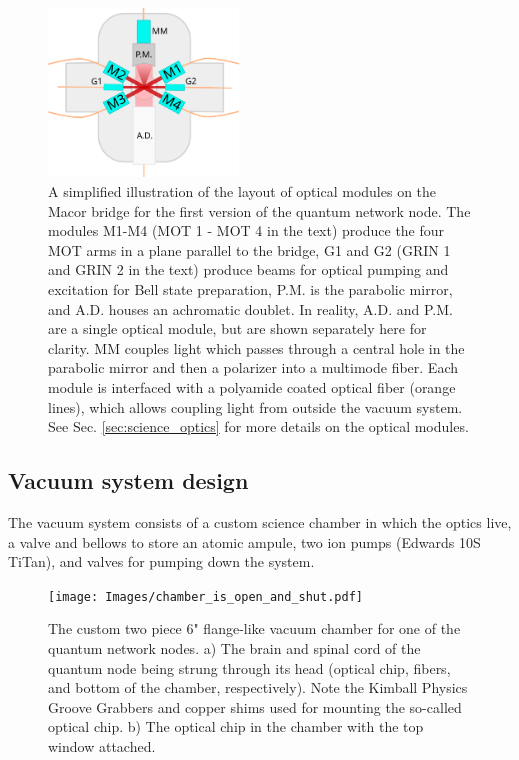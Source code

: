 \begin{figure}[!ht]
    \centering
    \includegraphics[width=0.45\textwidth]{Images/optical_chip_schematic.pdf}
    \caption{A simplified illustration of the layout of optical modules on the Macor bridge for the first version of the quantum network node. The modules M1-M4 (MOT 1 - MOT 4 in the text) produce the four MOT arms in a plane parallel to the bridge, G1 and G2 (GRIN 1 and GRIN 2 in the text) produce beams for optical pumping and excitation for Bell state preparation, P.M. is the parabolic mirror, and A.D. houses an achromatic doublet. In reality, A.D. and P.M. are a single optical module, but are shown separately here for clarity. MM couples light which passes through a central hole in the parabolic mirror and then a polarizer into a multimode fiber. Each module is interfaced with a polyamide coated optical fiber (orange lines), which allows coupling  light from outside the vacuum system. See Sec. \ref{sec:science_optics} for more details on the optical modules.}
    \label{fig:optical_chip_design}
\end{figure}

\subsection{Vacuum system design}

The vacuum system consists of a custom science chamber in which the optics live, a valve and bellows to store an atomic ampule, two ion pumps (Edwards 10S TiTan), and valves for pumping down the system. 
\begin{figure}
    \centering
    \texttt{[image: Images/chamber\_is\_open\_and\_shut.pdf]}
    \caption{The custom two piece 6" flange-like vacuum chamber for one of the quantum network nodes. a) The brain and spinal cord of the quantum node being strung through its head (optical chip, fibers, and bottom of the chamber, respectively). Note the Kimball Physics Groove Grabbers and copper shims used for mounting the so-called optical chip. b) The optical chip in the chamber with the top window attached.}
    \label{fig:vacuum_chamber_imgs}
\end{figure}


